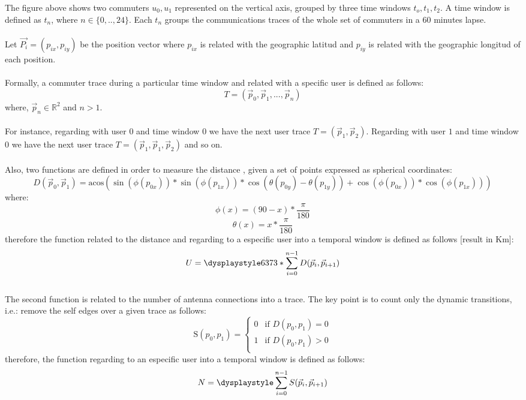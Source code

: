 The figure above shows two commuters ${u_0,u_1}$ represented on the vertical axis, grouped by three time windows $t_o,t_1,t_2$. A time window is defined as $t_n$, where $n \in \{0,..,24\}$. Each $t_n$ groups the communications traces of the whole set of commuters in a 60 minutes lapse. 
\\
\\
Let $\vec{P_i} = (p_{ix}, p_{iy})$ be the position vector where $p_{ix}$ is related with the geographic latitud and $p_{iy}$ is related with the geographic longitud of each position.
\\
\\
Formally, a commuter trace during a particular time window and related with a specific user is defined as follows:
$$ T = (\vec{p}_0, \vec{p}_1, ..., \vec{p}_n)  $$ where, 
$\vec{p}_n \in \mathbb{R}^2$ and $n > 1 $.
\\
\\
For instance, regarding with user $0$ and time window $0$ we have the next user trace $ T = (\vec{p}_1, \vec{p}_2)  $. Regarding with user $1$ and time window $0$ we have the next user trace $ T = (\vec{p}_1, \vec{p}_1, \vec{p}_2)  $ and so on.
\\
\\
Also, two functions are defined in order to measure the distance \citep{distance}, given a set of points expressed as spherical coordinates:
$$D(\vec{p}_0, \vec{p}_1) = \text{acos}( \sin(\phi(p_{0x})) * \sin(\phi(p_{1x})) * \cos(\theta(p_{0y}) - \theta(p_{1y})) + \cos(\phi(p_{0x})) * \cos(\phi(p_{1x})))  $$
where:
$$ \phi(x) = (90 - x) * \frac{\pi}{180}$$
$$ \theta(x) = x  * \frac{\pi}{180}$$
therefore the function related to the distance and regarding to a especific user into a temporal window is defined as follows [result in Km]:
$$U = \dysplaystyle 6373 * \sum_{i=0}^{n-1} D(\vec{p}_i, \vec{p}_{i+1}) $$
\\
The second function is related to the number of antenna connections into a trace. The key point is to count only the dynamic transitions, i.e.: remove the self edges over a given trace as follows:
\\
\begin{equation*}
\text{S}(p_0, p_1) = \left \{
\begin{matrix}
0 & \text{if } D(p_0, p_1) = 0 \\
1 & \text{if } D(p_0, p_1) > 0 \\
\end{matrix} \right.
\end{equation*}
therefore, the function regarding to an especific user into a temporal window is defined as follows:
$$N = \dysplaystyle \sum_{i=0}^{n-1} S(\vec{p}_i, \vec{p}_{i+1})$$
